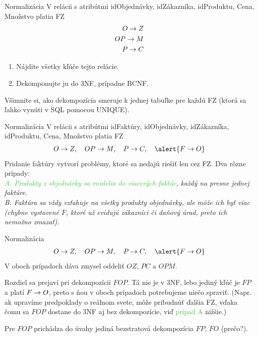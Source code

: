 \documentclass[12pt]{beamer}
\def\blue#1{\textcolor{Cerulean}{#1}}
\def\green#1{\textcolor{LimeGreen}{#1}}
\begin{document}
\begin{frame}[fragile]{Normalizácia}
V relácii s atribútmi id\blue{O}bjednávky, id\blue{Z}ákazníka, id\blue{P}roduktu, \blue{C}ena, \blue{M}nožstvo platia FZ
\begin{eqnarray*}
O\rightarrow Z\\
OP\rightarrow M\\
P\rightarrow C
\end{eqnarray*}

\bigskip
\begin{enumerate}
\item Nájdite všetky kľúče tejto relácie.
\item Dekomponujte ju do 3NF, prípadne BCNF.
\end{enumerate}
\pause
\medskip
Všimnite si, ako dekompozícia smeruje k jednej tabuľke pre každú FZ (ktorá sa ľahko vynúti v SQL pomocou UNIQUE).
\end{frame}

\begin{frame}[fragile]{Normalizácia}
V relácii s atribútmi id\alert{F}aktúry, id\blue{O}bjednávky, id\blue{Z}ákazníka, id\blue{P}roduktu, \blue{C}ena, \blue{M}nožstvo platia FZ
\begin{eqnarray*}
O\fz Z, \quad OP\fz M, \quad P\fz C, \quad \alert{F\fz O}
\end{eqnarray*}
Pridanie faktúry vytvorí problémy, ktoré sa nedajú riešiť len cez FZ. Dva rôzne prípady:\\[2mm]
\emph{\green{A. Produkty z objednávky sa rozdelia do viacerých faktúr}, každý na presne jednej faktúre.}\\[2mm]
\emph{\blue{B. Faktúra sa vždy vzťahuje na všetky produkty objednávky}, ale môže ich byť viac
(chybne vystavené $F$, ktoré už evidujú zákazníci či daňový úrad, preto ich nemožno zmazať).}\\[2mm]
\end{frame}

\begin{frame}[fragile]{Normalizácia}
\begin{eqnarray*}
O\fz Z, \quad OP\fz M, \quad P\fz C, \quad \alert{F\fz O}
\end{eqnarray*}
V oboch prípadoch dáva zmysel oddeliť $OZ$, $PC$ a $OPM$.
\bigskip

Rozdiel sa prejaví pri dekompozícii $FOP$. Tá nie je v 3NF, lebo jediný kľúč je $FP$ a platí $F\rightarrow O$, preto s ňou v oboch prípadoch potrebujeme niečo spraviť.
(Napr. ak upravíme predpoklady o reálnom svete, môže pribudnúť ďalšia FZ, vďaka čomu sa $FOP$ dostane do 3NF aj bez dekompozície, viď \green{prípad A} nižšie.)
\bigskip

Pre $FOP$ prichádza do úvahy jediná bezstratová dekompozícia $FP$, $FO$ (prečo?).
\end{frame}
\end{document}
